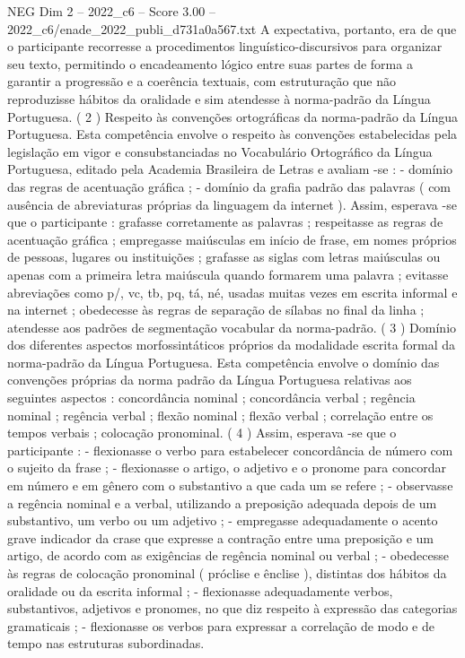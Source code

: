 \begin{textsample}{NEG Dim 2 – 2022\_c6 – Score 3.00 – 2022\_c6/enade\_2022\_publi\_d731a0a567.txt}
A expectativa, portanto, era de que o participante recorresse a procedimentos linguístico-discursivos para organizar seu texto, permitindo o encadeamento lógico entre suas partes de forma a garantir a progressão e a coerência textuais, com estruturação que não reproduzisse hábitos da oralidade e sim atendesse à norma-padrão da Língua Portuguesa. ( 2 ) Respeito às convenções ortográficas da norma-padrão da Língua Portuguesa.
Esta competência envolve o respeito às convenções estabelecidas pela legislação em vigor e consubstanciadas no Vocabulário Ortográfico da Língua Portuguesa, editado pela Academia Brasileira de Letras e avaliam -se : - domínio das regras de acentuação gráfica ; - domínio da grafia padrão das palavras ( com ausência de abreviaturas próprias da linguagem da internet ).
Assim, esperava -se que o participante : grafasse corretamente as palavras ; respeitasse as regras de acentuação gráfica ; empregasse maiúsculas em início de frase, em nomes próprios de pessoas, lugares ou instituições ; grafasse as siglas com letras maiúsculas ou apenas com a primeira letra maiúscula quando formarem uma palavra ; evitasse abreviações como p/, vc, tb, pq, tá, né, usadas muitas vezes em escrita informal e na internet ; obedecesse às regras de separação de sílabas no final da linha ; atendesse aos padrões de segmentação vocabular da norma-padrão. ( 3 ) Domínio dos diferentes aspectos morfossintáticos próprios da modalidade escrita formal da norma-padrão da Língua Portuguesa.
Esta competência envolve o domínio das convenções próprias da norma padrão da Língua Portuguesa relativas aos seguintes aspectos : concordância nominal ; concordância verbal ; regência nominal ; regência verbal ; flexão nominal ; flexão verbal ; correlação entre os tempos verbais ; colocação pronominal. ( 4 ) Assim, esperava -se que o participante : - flexionasse o verbo para estabelecer concordância de número com o sujeito da frase ; - flexionasse o artigo, o adjetivo e o pronome para concordar em número e em gênero com o substantivo a que cada um se refere ; - observasse a regência nominal e a verbal, utilizando a preposição adequada depois de um substantivo, um verbo ou um adjetivo ; - empregasse adequadamente o acento grave indicador da crase que expresse a contração entre uma preposição e um artigo, de acordo com as exigências de regência nominal ou verbal ; - obedecesse às regras de colocação pronominal ( próclise e ênclise ), distintas dos hábitos da oralidade ou da escrita informal ; - flexionasse adequadamente verbos, substantivos, adjetivos e pronomes, no que diz respeito à expressão das categorias gramaticais ; - flexionasse os verbos para expressar a correlação de modo e de tempo nas estruturas subordinadas.

\end{textsample}
